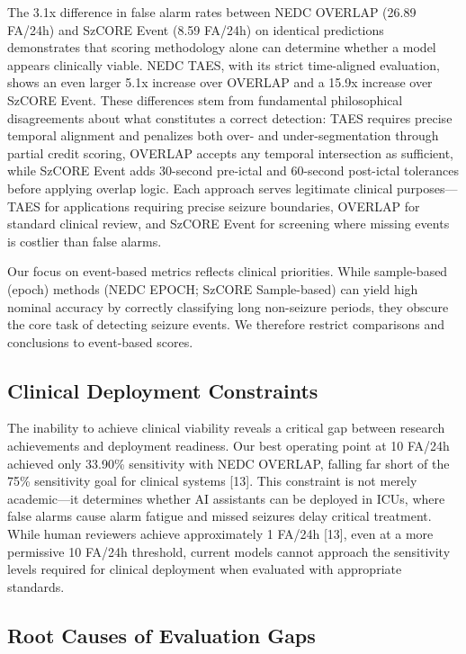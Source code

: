 \documentclass[
]{article}
\begin{document}
The 3.1x difference in false alarm rates between NEDC OVERLAP (26.89
FA/24h) and SzCORE Event (8.59 FA/24h) on identical predictions
demonstrates that scoring methodology alone can determine whether a
model appears clinically viable. NEDC TAES, with its strict time-aligned
evaluation, shows an even larger 5.1x increase over OVERLAP and a 15.9x
increase over SzCORE Event. These differences stem from fundamental
philosophical disagreements about what constitutes a correct detection:
TAES requires precise temporal alignment and penalizes both over- and
under-segmentation through partial credit scoring, OVERLAP accepts any
temporal intersection as sufficient, while SzCORE Event adds 30-second
pre-ictal and 60-second post-ictal tolerances before applying overlap
logic. Each approach serves legitimate clinical purposes---TAES for
applications requiring precise seizure boundaries, OVERLAP for standard
clinical review, and SzCORE Event for screening where missing events is
costlier than false alarms.

Our focus on event-based metrics reflects clinical priorities. While
sample-based (epoch) methods (NEDC EPOCH; SzCORE Sample-based) can yield
high nominal accuracy by correctly classifying long non-seizure periods,
they obscure the core task of detecting seizure events. We therefore
restrict comparisons and conclusions to event-based scores.

\hypertarget{clinical-deployment-constraints}{%
\subsection{Clinical Deployment
Constraints}\label{clinical-deployment-constraints}}

The inability to achieve clinical viability reveals a critical gap
between research achievements and deployment readiness. Our best
operating point at 10 FA/24h achieved only 33.90\% sensitivity with NEDC
OVERLAP, falling far short of the 75\% sensitivity goal for clinical
systems {[}13{]}. This constraint is not merely academic---it determines
whether AI assistants can be deployed in ICUs, where false alarms cause
alarm fatigue and missed seizures delay critical treatment. While human
reviewers achieve approximately 1 FA/24h {[}13{]}, even at a more
permissive 10 FA/24h threshold, current models cannot approach the
sensitivity levels required for clinical deployment when evaluated with
appropriate standards.

\hypertarget{root-causes-of-evaluation-gaps}{%
\subsection{Root Causes of Evaluation
Gaps}\label{root-causes-of-evaluation-gaps}}
\end{document}
